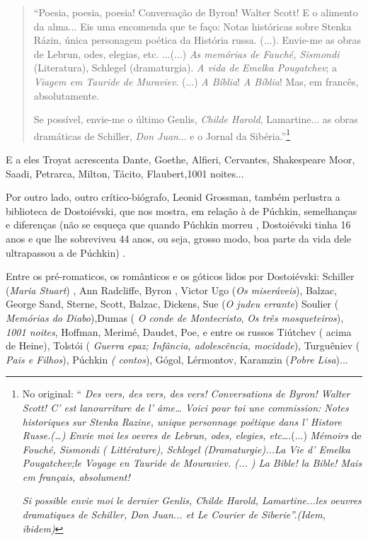 \begin{quote}
``Poesia, poesia, poesia! Conversação de Byron! Walter Scott! E o
alimento da alma... Eis uma encomenda que te faço: Notas históricas
sobre Stenka Rázin, única personagem poética da História russa. (...).
Envie-me as obras de Lebrun, odes, elegias, etc. ...(...) \emph{As
memórias de Fauché, Sismondi} (Literatura), Schlegel (dramaturgia).
\emph{A vida de Emelka Pougatchev}; a \emph{Viagem em Tauride de
Muraviev}. (...) \emph{A Bíblia}! \emph{A Bíblia}! Mas, em francês,
absolutamente.

Se possível, envie-me o último Genlis, \emph{Childe Harold},
Lamartine... as obras dramáticas de Schiller, \emph{Don Juan}... e o
Jornal da Sibéria.''\footnote{No original: `` \emph{Des vers, des vers,
  des vers! Conversations de Byron! Walter Scott! C' est lanourriture de
  l' âme\ldots{} Voici pour toi une commission: Notes historiques sur
  Stenka Razine, unique personnage poétique dans l' Histore
  Russe.(\ldots{}) Envie moi les oevres de Lebrun, odes, elegies,
  etc}\ldots{}.(...) \emph{Mémoirs} de \emph{Fouché, Sismondi (
  Littérature), Schlegel (Dramaturgie)...La Vie d' Emelka Pougatchev;le
  Voyage en Tauride de Mouraviev. (... ) La Bible! la Bible! Mais em
  français, absolument!}

  \emph{Si possible envie moi le dernier Genlis, Childe Harold,
  Lamartine...les oeuvres dramatiques de Schiller, Don Juan... et Le
  Courier de Siberie''.(Idem, ibidem)}}
\end{quote}

E a eles Troyat acrescenta Dante, Goethe, Alfieri, Cervantes,
Shakespeare Moor, Saadi, Petrarca, Milton, Tácito, Flaubert,1001
noites...

Por outro lado, outro crítico-biógrafo, Leonid Grossman, também
perlustra a biblioteca de Dostoiévski, que nos mostra, em relação à de
Púchkin, semelhanças e diferenças (não se esqueça que quando Púchkin
morreu , Dostoiévski tinha 16 anos e que lhe sobreviveu 44 anos, ou
seja, grosso modo, boa parte da vida dele ultrapassou a de Púchkin) .

Entre os pré-romaticos, os românticos e os góticos lidos por
Dostoiévski: Schiller (\emph{Maria Stuart}) , Ann Radcliffe, Byron ,
Victor Ugo (\emph{Os miseráveis}), Balzac, George Sand, Sterne, Scott,
Balzac, Dickens, Sue (\emph{O judeu errante}) Soulier ( \emph{Memórias
do Diabo}),Dumas ( \emph{O conde de Montecristo}, \emph{Os três
mosqueteiros}), \emph{1001 noites}, Hoffman, Merimé, Daudet, Poe, e
entre os russos Tiútchev ( acima de Heine), Tolstói ( \emph{Guerra epaz;
Infância, adolescência, mocidade}), Turguêniev ( \emph{Pais e Filhos}),
Púchkin \emph{( contos}), Gógol, Lérmontov, Karamzin (\emph{Pobre
Lisa})...

